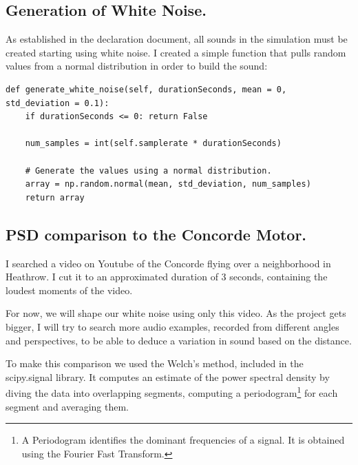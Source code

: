 \documentclass[10.5pt]{article}
\begin{document}
	\subsection{Generation of White Noise.}
	
	As established in the declaration document, all sounds in the simulation must be created starting using white noise. I created a simple function that pulls random values from a normal distribution in order to build the sound:
	
	\begin{lstlisting}
def generate_white_noise(self, durationSeconds, mean = 0, std_deviation = 0.1):
	if durationSeconds <= 0: return False
	
	num_samples = int(self.samplerate * durationSeconds)
	
	# Generate the values using a normal distribution.
	array = np.random.normal(mean, std_deviation, num_samples)
	return array	
	\end{lstlisting}
	
	\subsection{PSD comparison to the Concorde Motor.}
	
	I searched a video on Youtube of the Concorde flying over a neighborhood in Heathrow. I cut it to an approximated duration of 3 seconds, containing the loudest moments of the video.
	
	For now, we will shape our white noise using only this video. As the project gets bigger, I will try to search more audio examples, recorded from different angles and perspectives, to be able to deduce a variation in sound based on the distance.
	
	To make this comparison we used the Welch's method, included in the scipy.signal library. It computes an estimate of the power spectral density by diving the data into overlapping segments, computing a periodogram\footnote{A Periodogram identifies the dominant frequencies of a signal. It is obtained using the Fourier Fast Transform.} for each segment and averaging them. 
	
\end{document}
